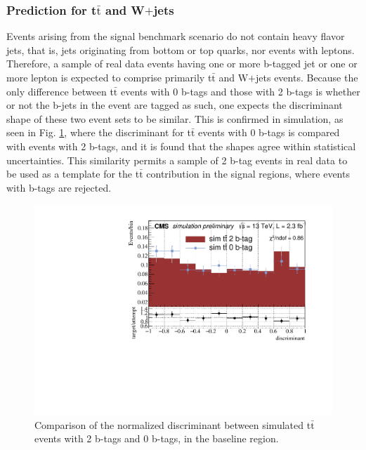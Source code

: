 \subsubsection{Prediction for t$\bar{\text{t}}$ and W$+$jets}
Events arising from the signal benchmark scenario do not contain heavy flavor jets, that is, jets originating from bottom or top quarks, nor events with leptons. Therefore, a sample of real data events having one or more b-tagged jet or one or more lepton is expected to comprise primarily t$\bar{\text{t}}$ and W$+$jets events. Because the only difference between t$\bar{\text{t}}$ events with 0 b-tags and those with 2 b-tags is whether or not the b-jets in the event are tagged as such, one expects the discriminant shape of these two event sets to be similar. This is confirmed in simulation, as seen in Fig. \ref{fig:ttbar2b0b}, where the discriminant for t$\bar{\text{t}}$ events with 0 b-tags is compared with events with 2 b-tags, and it is found that the shapes agree within statistical uncertainties. This similarity permits a sample of 2 b-tag events in real data to be used as a template for the t$\bar{\text{t}}$ contribution in the signal regions, where events with b-tags are rejected.
\begin{figure}[tb!]
\centering
\includegraphics[width=0.55\linewidth]{figures/SusySearches/MvaSusy/TTbar2bVs0b.pdf}
\caption{Comparison of the normalized discriminant between simulated t$\bar{\text{t}}$ events with 2 b-tags and 0 b-tags, in the baseline region.}
\label{fig:ttbar2b0b}
\end{figure}

